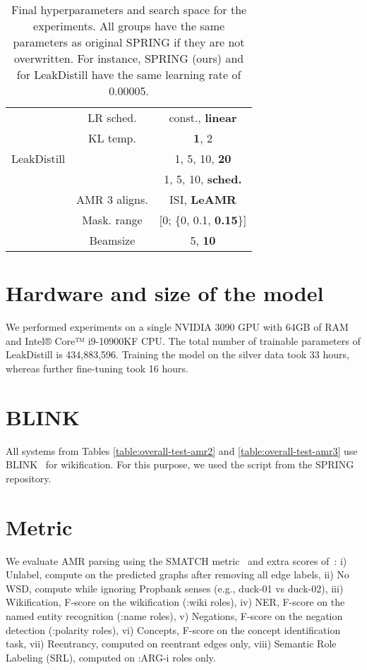 \documentclass[11pt]{article}
\begin{document}
\begin{table}[hbt!]
{\begin{tabular}{lcc}
\midrule
\multirow{5}{*}{LeakDistill} 
                       & LR sched. & const., \textbf{linear} \\
                       & KL temp. & \textbf{1}, 2 \\
                       &  & 1, 5, 10, \textbf{20} \\
                       &  & 1, 5, 10, \textbf{sched.} \\
                       & AMR 3 aligns.  & ISI, \textbf{LeAMR} \\
                       & Mask. range  & [0; \{0, 0.1, \textbf{0.15}\}] \\
                       & Beamsize & 5, \textbf{10}\\
 \bottomrule
\end{tabular}}
\caption{Final hyperparameters and search space for the experiments. All groups have the same parameters as original SPRING if they are not overwritten. For instance, SPRING (ours) and for LeakDistill have the same learning rate of 0.00005.  }
\label{table:hp-space}
\end{table}

\section{Hardware and size of the model}
We performed experiments on a single NVIDIA 3090 GPU with 64GB of RAM and Intel®
Core™ i9-10900KF CPU.
The total number of trainable parameters of LeakDistill is 434,883,596.
Training the model on the silver data took 33 hours, whereas further fine-tuning took 16 hours.

\section{BLINK}
All systems from Tables \ref{table:overall-test-amr2} and  \ref{table:overall-test-amr3} use BLINK~\cite{wu-etal-2020-scalable} for wikification. For this purpose, we used the  script from the SPRING repository.


\section{Metric}\label{appendix:metric}

We evaluate AMR parsing using the SMATCH metric~\cite{cai-knight-2013-smatch} and extra scores of~\citet{damonte-etal-2017-incremental}: i) Unlabel, compute on the predicted graphs after removing all edge labels, ii) No WSD, compute while ignoring Propbank senses (e.g., duck-01 vs duck-02), iii) Wikification, F-score on the wikification (:wiki roles), iv) NER, F-score on the named entity recognition (:name roles), v) Negations, F-score on the negation detection (:polarity roles), vi) Concepts, F-score on the concept identification task, vii) Reentrancy, computed on reentrant edges only, viii) Semantic Role Labeling (SRL), computed on :ARG-i roles only. 
\end{document}
